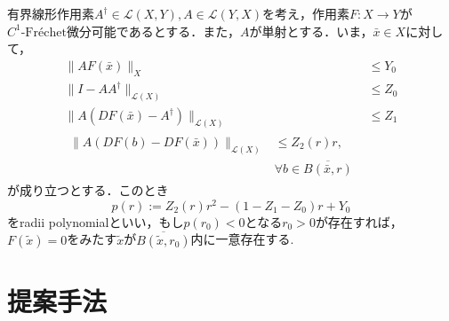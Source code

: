 \documentclass[a4paper,10pt,twocolumn]{jsarticle}
\newcommand{\fre}{Fr\'{e}chet}
\begin{document}
\begin{Thm}
  \label{thm:radii}
  有界線形作用素$A^\dagger \in \mathcal{L}(X, Y), A \in \mathcal{L}(Y, X)$を考え，作用素$F:X \rightarrow Y$が$C^1\text{-\fre{}}$微分可能であるとする．また，$A$が単射とする．いま，$\bar{x} \in X$に対して，
  \begin{align}
      \|AF(\bar{x})\|_X                             & \leq Y_0                                             \\
      \|I-AA^\dagger\|_{\mathcal{L}(X)}              & \leq Z_0                                             \\
      \|A(DF(\bar{x})-A^\dagger)\|_{\mathcal{L}(X)} & \leq Z_1                                             \\
      \begin{split}
        \|A(DF(b)-DF(\bar{x}))\|_{\mathcal{L}(X)} &\leq Z_2(r)r, \\ & \forall b \in \overline{B(\bar{x},r)}
      \end{split}
  \end{align}
  が成り立つとする．このとき
  \begin{equation}
    p(r) := Z_2(r)r^2 - (1-Z_1-Z_0)r+Y_0
  \end{equation}
  をradii polynomialといい，もし$p(r_0)<0$となる$r_0>0$が存在すれば，$F(\tilde{x})=0$をみたす$\tilde{x}$が$\overline{B(\tilde{x},r_0)}$内に一意存在する.
\end{Thm}

\vspace{-1mm}
\section{提案手法}
\vspace{-1mm}
\end{document}
